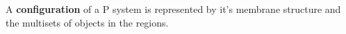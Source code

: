 A {\bf configuration} of a P system is represented by it's membrane structure and the multisets of objects in the regions.
